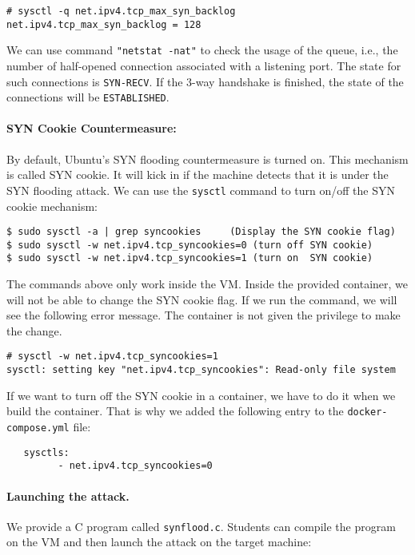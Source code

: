 \begin{lstlisting}
# sysctl -q net.ipv4.tcp_max_syn_backlog
net.ipv4.tcp_max_syn_backlog = 128
\end{lstlisting}

We can use command \texttt{"netstat -nat"} to check the usage of the queue, 
i.e., the number of half-opened connection associated with a listening port. 
The state for such connections is \texttt {SYN-RECV}. If the 3-way handshake
is finished, the state of the connections will be {\tt ESTABLISHED}.


\paragraph{SYN Cookie Countermeasure:}
By default, Ubuntu's SYN flooding countermeasure is turned on. This 
mechanism is called SYN cookie. It will kick in if the machine
detects that it is under the SYN flooding attack.
We can use the {\tt sysctl} command to turn on/off the SYN 
cookie mechanism:

\begin{lstlisting}
$ sudo sysctl -a | grep syncookies     (Display the SYN cookie flag) 
$ sudo sysctl -w net.ipv4.tcp_syncookies=0 (turn off SYN cookie)
$ sudo sysctl -w net.ipv4.tcp_syncookies=1 (turn on  SYN cookie)
\end{lstlisting}

The commands above only work inside the VM.  
Inside the provided container, we will not be able to change 
the SYN cookie flag. If we run the command, 
we will see the following error message. The container
is not given the privilege to make the change. 

\begin{lstlisting}
# sysctl -w net.ipv4.tcp_syncookies=1
sysctl: setting key "net.ipv4.tcp_syncookies": Read-only file system
\end{lstlisting}

If we want to turn off the SYN cookie in a container, 
we have to do it when we build the container. 
That is why we added the following entry
to the \texttt{docker-compose.yml} file:  

\begin{lstlisting}
   sysctls:
         - net.ipv4.tcp_syncookies=0
\end{lstlisting}

 


\paragraph{Launching the attack.}
We provide a C program called \texttt{synflood.c}. Students can compile
the program on the VM and then launch the attack on the target machine:

